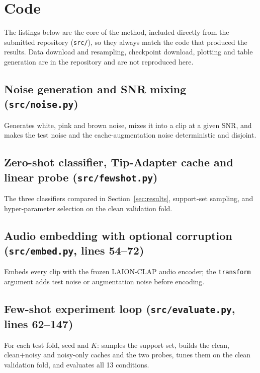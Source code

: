 \section{Code}
\label{app:code}
The listings below are the core of the method, included directly from the submitted repository (\texttt{src/}), so they always match the code that produced the results.
Data download and resampling, checkpoint download, plotting and table generation are in the repository and are not reproduced here.


\subsection{Noise generation and SNR mixing (\texttt{src/noise.py})}
Generates white, pink and brown noise, mixes it into a clip at a given SNR, and makes the test noise and the cache-augmentation noise deterministic and disjoint.


\subsection{Zero-shot classifier, Tip-Adapter cache and linear probe (\texttt{src/fewshot.py})}
The three classifiers compared in Section~\ref{sec:results}, support-set sampling, and hyper-parameter selection on the clean validation fold.


\subsection{Audio embedding with optional corruption (\texttt{src/embed.py}, lines 54--72)}
Embeds every clip with the frozen LAION-CLAP audio encoder; the \texttt{transform} argument adds test noise or augmentation noise before encoding.


\subsection{Few-shot experiment loop (\texttt{src/evaluate.py}, lines 62--147)}
For each test fold, seed and $K$: samples the support set, builds the clean, clean+noisy and noisy-only caches and the two probes, tunes them on the clean validation fold, and evaluates all 13 conditions.

